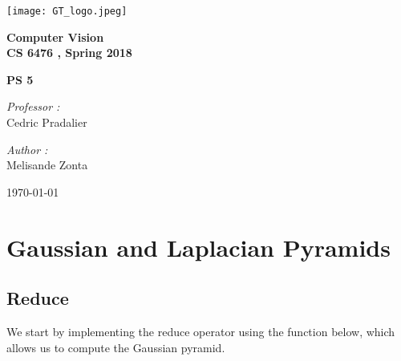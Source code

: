 \documentclass[a4paper,11pt]{article}
\begin{document}

\begin{titlepage}

\begin{center}
\texttt{[image: GT\_logo.jpeg]}
\end{center}
\hrulefill
\begin{center}\bfseries\huge
   Computer Vision \\
   CS 6476 , Spring 2018\\
   \end{center}
  \begin{center}\bfseries\large
     PS 5\\
    \hrulefill
\end{center}
\vspace*{1cm}
\begin{minipage}[t]{0.6\textwidth}
  \begin{flushleft} \large
    \emph{Professor : }\\
    Cedric Pradalier \\
  \end{flushleft}
\end{minipage}
\begin{minipage}[t]{0.3\textwidth}
  \begin{flushright} \large
    \emph{Author :} \\
    Melisande Zonta \\
  \end{flushright}
\end{minipage}
\begin{flushright}
       \today 
\end{flushright} 
\end{titlepage}

\tableofcontents
\clearpage




\section{Gaussian and Laplacian Pyramids}

\subsection{Reduce}

We start by implementing the reduce operator using the function below, which allows us to compute the Gaussian pyramid.
\end{document}

